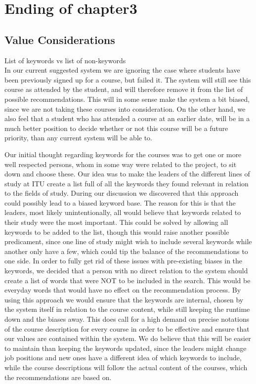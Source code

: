 
\section{Ending of chapter3}
\subsection{Value Considerations} %
\label{sub:value_considerations}
List of keywords vs list of non-keywords\\
In our current suggested system we are ignoring the case where students have been previously signed up for a course, but failed it. The system will still see this course as attended by the student, and will therefore remove it from the list of possible recommendations. This will in some sense make the system a bit biased, since we are not taking these courses into consideration. On the other hand, we also feel that a student who has attended a course at an earlier date, will be in a much better position to decide whether or not this course will be a future priority, than any current system will be able to.

Our initial thought regarding keywords for the courses was to get one or more well respected persons, whom in some way were related to the project, to sit down and choose these. Our idea was to make the leaders of the different lines of study at ITU create a list full of all the keywords they found relevant in relation to the fields of study. During our discussion we discovered that this approach could possibly lead to a biased keyword base. The reason for this is that the leaders, most likely unintentionally, all would believe that keywords related to their study were the most important. This could be solved by allowing all keywords to be added to the list, though this would raise another possible predicament, since one line of study might wish to include several keywords while another only have a few, which could tip the balance of the recommendations to one side. 
In order to fully get rid of these issues with pre-existing biases in the keywords, we decided that a person with no direct relation to the system should create a list of words that were NOT to be included in the search. This would be everyday words that would have no effect on the recommendation process. By using this approach we would ensure that the keywords are internal, chosen by the system itself in relation to the course content, while still keeping the runtime down and the biases away.
This does call for a high demand on precise notations of the course description for every course in order to be effective and ensure that our values are contained within the system. We do believe that this will be easier to maintain than keeping the keywords updated, since the leaders might change job positions and new ones have a different idea of which keywords to include, while the course descriptions will follow the actual content of the courses, which the recommendations are based on. 

